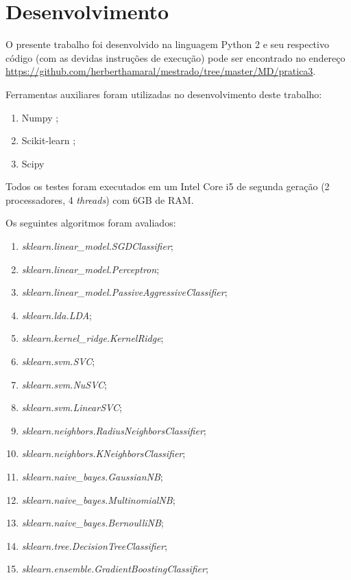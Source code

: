 \documentclass[11pt]{article}
\begin{document}
     
\section{Desenvolvimento}

O presente trabalho foi desenvolvido na linguagem Python 2 e seu respectivo
código (com as devidas instruções de execução) pode ser encontrado no endereço
\url{https://github.com/herberthamaral/mestrado/tree/master/MD/pratica3}.

Ferramentas auxiliares foram utilizadas no desenvolvimento deste trabalho:

\begin{enumerate}
    \item Numpy \cite{numpy};
    \item Scikit-learn \cite{scikitlearn};
    \item Scipy \cite{scipy}
\end{enumerate}

Todos os testes foram executados em um Intel Core i5 de segunda geração (2
processadores, 4 \textit{threads}) com 6GB de RAM.

Os seguintes algoritmos foram avaliados:
\label{listaalgoritmos}
\begin{enumerate}
    \item \textit{sklearn.linear\_model.SGDClassifier};
    \item \textit{sklearn.linear\_model.Perceptron};
    \item \textit{sklearn.linear\_model.PassiveAggressiveClassifier};
    \item \textit{sklearn.lda.LDA};
    \item \textit{sklearn.kernel\_ridge.KernelRidge};
    \item \textit{sklearn.svm.SVC};
    \item \textit{sklearn.svm.NuSVC};
    \item \textit{sklearn.svm.LinearSVC};
    \item \textit{sklearn.neighbors.RadiusNeighborsClassifier};
    \item \textit{sklearn.neighbors.KNeighborsClassifier};
    \item \textit{sklearn.naive\_bayes.GaussianNB};
    \item \textit{sklearn.naive\_bayes.MultinomialNB};
    \item \textit{sklearn.naive\_bayes.BernoulliNB};
    \item \textit{sklearn.tree.DecisionTreeClassifier};
    \item \textit{sklearn.ensemble.GradientBoostingClassifier};
\end{enumerate}
\end{document}
